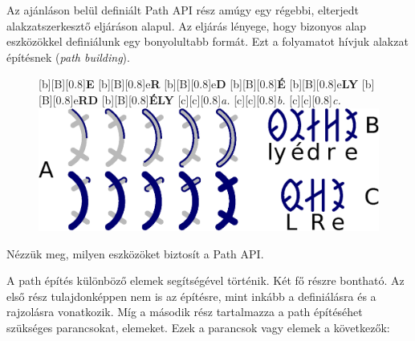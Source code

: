 \documentclass[12pt]{report}
\theoremstyle{definition}
\newcommand{\inenglish}[1]{\textsl{#1}}
\begin{document}
  Az ajánláson belül definiált Path API rész amúgy egy régebbi, elterjedt
alakzatszerkesztő eljáráson alapul. Az eljárás lényege, hogy bizonyos alap
eszközökkel definiálunk egy bonyolultabb formát. Ezt a folyamatot hívjuk
alakzat építésnek (\inenglish{path building}).


    \begin{figure}[h]
    \centering
    [b][B][0.8]{\bf{E}}
    [b][B][0.8]{e\bf{R}}
    [b][B][0.8]{e\bf{D}}
    [b][B][0.8]{\bf{É}}
    [b][B][0.8]{e\bf{LY}}
    [b][B][0.8]{e\bf{RD}}
    [b][B][0.8]{\bf{ÉLY}}
    [c][c][0.8]{\it{a.}}
    [c][c][0.8]{\it{b.}}
    [c][c][0.8]{\it{c.}}
    \includegraphics[scale=0.6]{img/w3c_erdely_eps}
    \caption{\label{erdely}
    }
    \end{figure}


  Nézzük meg, milyen eszközöket biztosít a Path API.


A path építés
különböző elemek segítségével történik. Két fő részre bontható. Az első rész
tulajdonképpen nem is az építésre, mint inkább a definiálásra és a rajzolásra
vonatkozik. Míg a második rész tartalmazza a path építéséhet szükséges
parancsokat, elemeket. Ezek a parancsok vagy elemek a következők:
\end{document}
